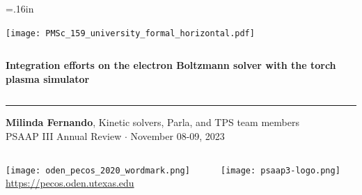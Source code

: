 \documentclass[mathserif, aspectratio=169]{beamer}
\begin{document}


\hoffset=.16in

\begin{frame}[plain,t]{}
\makeatletter
\texttt{[image: PMSc\_159\_university\_formal\_horizontal.pdf]} \newline
\begin{columns}[T,onlytextwidth]
{\bf \color{burntorange} \selectfont 
Integration efforts on the electron Boltzmann solver with the torch plasma simulator
}
\end{columns}
\vspace*{.15cm}
\rule{.8\textwidth}{0.6pt} \newline

\vspace*{0.05cm}
{\selectfont
  { \scriptsize
    \textbf{Milinda Fernando}, Kinetic solvers, Parla, and TPS team members \\
  }
  {\color{burntorange} \tiny
    PSAAP III Annual Review $\cdot$ November 08-09, 2023
  }
}

\vspace*{1cm}
\begin{columns}
\begin{column}{0.8\linewidth}
\texttt{[image: oden\_pecos\_2020\_wordmark.png]}\\
{\scriptsize \url{https://pecos.oden.utexas.edu}}
\end{column}

\begin{column}{0.2\linewidth}
\texttt{[image: psaap3-logo.png]}
\end{column}
\end{columns}

\end{frame}
\hoffset=0in
\end{document}
